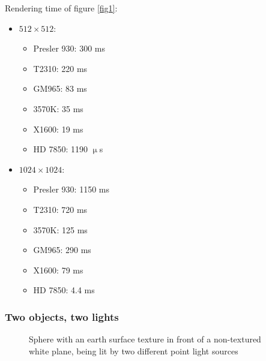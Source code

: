 \documentclass[english,fleqn,10pt,twocolumn]{article}
\begin{document}
Rendering time of figure \ref{fig1}:
\begin{itemize}
    \item $512 \times 512$:
        \begin{itemize}
            \item Presler 930: 300 ms
            \item T2310: 220 ms
            \item GM965: 83 ms
            \item 3570K: 35 ms
            \item X1600: 19 ms
            \item HD 7850: 1190 $\upmu$s
        \end{itemize}
    \item $1024 \times 1024$:
        \begin{itemize}
            \item Presler 930: 1150 ms
            \item T2310: 720 ms
            \item 3570K: 125 ms
            \item GM965: 290 ms
            \item X1600: 79 ms
            \item HD 7850: 4.4 ms
        \end{itemize}
\end{itemize}

\subsubsection{Two objects, two lights}

\begin{figure}[ht]
    \centering {}
    \caption{Sphere with an earth surface texture in front of a non-textured white plane, being lit by two different point light sources}
    \label{fig2}
\end{figure}
\end{document}
